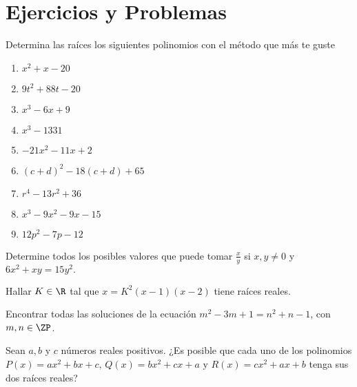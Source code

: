 \section{Ejercicios y Problemas}
{
    \begin{exercise}
        Determina las raíces los siguientes polinomios con el método que más te guste
        \begin{multicols}{3}
            \begin{enumerate}
                \item $x^2 + x - 20$
                \item $9t^2 + 88t - 20$
                \item $x^3 - 6x + 9$
                \item $x^3 - 1331$
                \item $-21x^2 - 11x + 2$
                \item $(c + d)^2 - 18(c + d) + 65$
                \item $r^4 - 13r^2 + 36$
                \item $x^3 - 9x^2 - 9x - 15$
                \item $12p^2 - 7p - 12$
            \end{enumerate}
        \end{multicols}
    \end{exercise}

    \begin{section-problem}
        Determine todos los posibles valores que puede tomar $\frac{x}{y}$ si $x, y \neq 0$ y $6x^2 + xy = 15y^2.$
    \end{section-problem}

    \begin{section-problem}
        Hallar $K \in \R$ tal que $x = K^2(x - 1)(x - 2)$ tiene raíces reales.
    \end{section-problem}

    \begin{section-problem}
        Encontrar todas las soluciones de la ecuación $m^2 - 3m + 1 = n^2 + n - 1$, con $m, n \in \ZP$.
    \end{section-problem}

    \begin{section-problem}
        Sean $a, b$ y $c$ números reales positivos. ¿Es posible que cada uno de los polinomios $P(x) = ax^2 + bx + c \mbox{, } Q(x) = bx^2 + cx + a \mbox{ y } R(x) = cx^2 + ax + b$ tenga sus dos raíces reales?
    \end{section-problem}

}\label{sec:ejercicios-y-problemas}